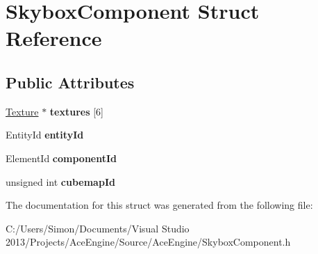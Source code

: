 \hypertarget{struct_skybox_component}{}\section{Skybox\+Component Struct Reference}
\label{struct_skybox_component}
\subsection*{Public Attributes}
\begin{DoxyCompactItemize}
\item 
\hypertarget{struct_skybox_component_a2f9e5017d59c212447a9270e2ddd4aa0}{}\hyperlink{struct_texture}{Texture} $\ast$ {\bfseries textures} \mbox{[}6\mbox{]}\label{struct_skybox_component_a2f9e5017d59c212447a9270e2ddd4aa0}

\item 
\hypertarget{struct_skybox_component_a04337bb57901881bc389a18e941b261d}{}Entity\+Id {\bfseries entity\+Id}\label{struct_skybox_component_a04337bb57901881bc389a18e941b261d}

\item 
\hypertarget{struct_skybox_component_abc4e5c051cec14bfefbb63fb3f5724c2}{}Element\+Id {\bfseries component\+Id}\label{struct_skybox_component_abc4e5c051cec14bfefbb63fb3f5724c2}

\item 
\hypertarget{struct_skybox_component_a794e5aa378c97d2bd5b276a7b048156c}{}unsigned int {\bfseries cubemap\+Id}\label{struct_skybox_component_a794e5aa378c97d2bd5b276a7b048156c}

\end{DoxyCompactItemize}


The documentation for this struct was generated from the following file\+:\begin{DoxyCompactItemize}
\item 
C\+:/\+Users/\+Simon/\+Documents/\+Visual Studio 2013/\+Projects/\+Ace\+Engine/\+Source/\+Ace\+Engine/Skybox\+Component.\+h\end{DoxyCompactItemize}
